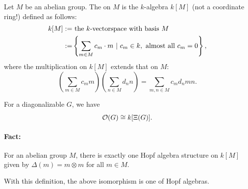 \begin{definition}
Let $M$ be an abelian group. The  on $M$ is the $k$-algebra $k[M]$ (not a coordinate ring!) defined as follows:
\begin{align*}
k[M] := & \text{ the }k\text{-vectorspace with basis }M\\
:= & \left\lbrace \sum_{m \in M} c_m \cdot m  ~ | ~ c_m \in k, \text{ almost all }c_m = 0\right\rbrace,
\end{align*}
where the multiplication on $k[M]$ extends that on $M$:
\[ (\sum_{m\in M}c_m m) (\sum_{n\in M} d_n n) = \sum_{m,n \in M} c_md_n mn. \]
\end{definition}
\begin{corollary}
	For a diagonalizable $G$, we have
	\[ \mathcal{O}(G) \overset{}{\cong} k[\Xi(G)]. \]
\end{corollary}

\paragraph{Fact:} For an abelian group $M$, there is exactly one Hopf algebra structure on $k[M]$ given by $\Delta(m) = m\otimes m$ for all $m \in M$.

With this definition, the above isomorphism is one of Hopf algebras.

